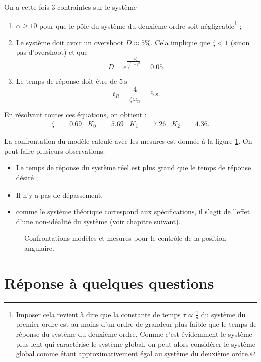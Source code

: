\documentclass[frenchb, paper=a4, fontsize=11pt]{scrartcl}
\numberwithin{equation}{section}					%
\numberwithin{figure}{section}					%
\numberwithin{table}{section}						%
\begin{document}
On a cette fois 3 contraintes sur le système
\begin{enumerate}
	\item $\alpha \geq 10$ pour que le pôle du système du deuxième ordre soit
	négligeable\footnote{Imposer cela revient à dire que la constante de temps $\tau
	\propto \frac{1}{a}$ du système du premier ordre est au moins d'un ordre de
	grandeur plus faible que le temps de réponse du système du deuxième ordre. Comme
	c'est évidemment le système plus lent qui caractérise le système global, on peut
	alors considérer le système global comme étant approximativement égal au
	système du deuxième ordre.} ;
	\item Le système doit avoir un overshoot $D \approx 5\%$. Cela implique que
	$\zeta < 1$ (sinon pas d'overshoot) et que
	\begin{equation}
		D = e^{\frac{-\pi\zeta}{\sqrt{1-\zeta^2}}} = 0.05.
	\end{equation}
	\item Le temps de réponse doit être de $\SI{5}{\second}$
	\begin{equation}
		t_R = \frac{4}{\zeta\omega_n} = \SI{5}{\second}.
	\end{equation}
\end{enumerate}
En résolvant toutes ces équations, on obtient :
\begin{align}
	\zeta & = 0.69 & K_0 & = 5.69 & K_1 & = 7.26 &  K_2 & = 4.36.
\end{align}

La confrontation du modèle calculé avec les mesures est donnée à la
figure \ref{fig:position_control}. On peut faire plusieurs
observations:
\begin{itemize}
	\item Le temps de réponse du système réel est plus grand que le temps
	de réponse désiré ;
	\item Il n'y a pas de dépassement.
	\item comme le système théorique correspond aux spécifications, 
	il s'agit de l'effet d'une 
	non-idéalité du système (voir chapitre suivant).
\end{itemize}

\begin{figure}[ht]
	\centering
	
	\caption{Confrontations modèles et mesures pour le contrôle
	de la position angulaire.}
	\label{fig:position_control}
\end{figure}


\section{Réponse à quelques questions}
\end{document}
